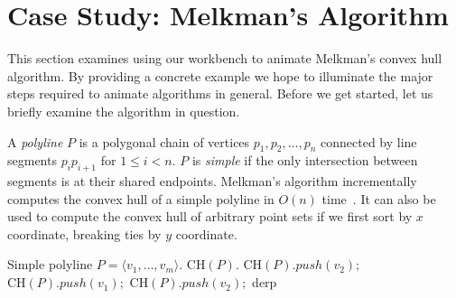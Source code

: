 
\FloatBarrier
\section{Case Study: Melkman's Algorithm}

This section examines using our workbench to animate Melkman's convex hull
algorithm. By providing a concrete example we hope to illuminate the major steps
required to animate algorithms in general. Before we get started, let us briefly
examine the algorithm in question.

A \emph{polyline} $P$ is a polygonal chain of vertices $p_1, p_2, \ldots, p_n$
connected by line segments $p_ip_{i+1}$ for $1 \leq i < n$. $P$ is \emph{simple}
if the only intersection between segments is at their shared endpoints.
Melkman's algorithm incrementally computes the convex hull of a simple polyline
in $O(n)$ time~\cite{melkman1987line}. It can also be used to compute the convex
hull of arbitrary point sets if we first sort by $x$ coordinate, breaking ties
by $y$ coordinate.





\begin{mdframed}[linecolor=white, backgroundcolor=algback, frametitle={Algorithm
Melkman}] \begin{algorithmic}[1]    
    \Require Simple polyline $P = \langle v_1, \ldots, v_m \rangle$.
    \Ensure $\text{CH}(P)$.
    \vspace{0.75em}
    \State $\text{CH}(P).push(v_2);$ $\text{CH}(P).push(v_1);$
    $\text{CH}(P).push(v_2);$ 
    	\State derp 
    \EndFor
    \EndProcedure
\end{algorithmic}
\end{mdframed} 













